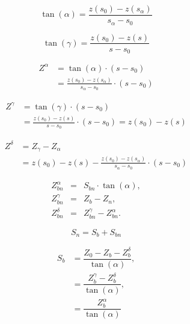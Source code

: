 \documentclass[10pt,a4paper]{article}
\begin{document}
	
	\begin{equation}
		\tan(\alpha) = \frac{z(s_0) - z(s_{\alpha})}{s_{\alpha} - s_0}
	\end{equation}

	\begin{equation}
		\tan(\gamma) = \frac{z(s_0) - z(s)}{s - s_0}
	\end{equation}
	
	\begin{equation}
		\begin{split}
			Z^{\alpha} & = \tan(\alpha) \cdot (s - s_0) \\
			& =\frac{z(s_0) - z(s_{\alpha})}{s_{\alpha} - s_0} \cdot (s - s_0)
		\end{split}
	\end{equation}

	\begin{equation}
		\begin{split}
			Z^{\gamma} & = \tan(\gamma) \cdot (s - s_0) \\
			& =\frac{z(s_0) - z(s)}{s - s_0} \cdot (s - s_0) = z(s_0) - z(s)
		\end{split}
	\end{equation}

	\begin{equation}
		\begin{split}
			Z^{\delta} & = Z_{\gamma} - Z_{\alpha} \\
			& = z(s_0) - z(s) - \frac{z(s_0) - z(s_{\alpha})}{s_{\alpha} - s_0} \cdot (s - s_0)
		\end{split}
	\end{equation}
	
	\begin{eqnarray}\label{equation:intensity} 
		Z^{\alpha}_{bn} &=& S_{bn} \cdot \tan(\alpha), \\
		Z^{\gamma}_{bn} &=& Z_b -Z_{n}, \\
		Z^\delta_{bn}  &=& Z^{\gamma}_{bn} - Z^{\alpha}_{bn}.
	\end{eqnarray}

	\begin{equation}
		S_n = S_b + S_{bn}
	\end{equation}

	\begin{equation}
		\begin{split}
			S_b & = \dfrac{Z_0 - Z_b - Z_b^{\delta}}{\tan(\alpha)}, \\
			& = \dfrac{Z_b^{\gamma} - Z_b^{\delta}}{\tan(\alpha)}, \\	
			& = \dfrac{Z_b^{\alpha}}{\tan(\alpha)}
		\end{split}
	\end{equation}
\end{document}
